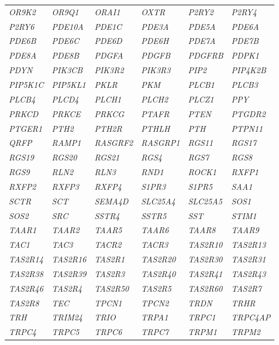 \begin{longtable}{>{\em}l>{\em}l>{\em}l>{\em}l>{\em}l>{\em}l}
  \rowcolor{black!10} 
  OR9K2 & OR9Q1 & ORAI1 & OXTR & P2RY2 & P2RY4 \\ 
  \rowcolor{black!5} 
  P2RY6 & PDE10A & PDE1C & PDE3A & PDE5A & PDE6A \\ 
  \rowcolor{black!10} 
  PDE6B & PDE6C & PDE6D & PDE6H & PDE7A & PDE7B \\ 
  \rowcolor{black!5} 
  PDE8A & PDE8B & PDGFA & PDGFB & PDGFRB & PDPK1 \\ 
  \rowcolor{black!10} 
  PDYN & PIK3CB & PIK3R2 & PIK3R3 & PIP2 & PIP4K2B \\ 
  \rowcolor{black!5} 
  PIP5K1C & PIP5KL1 & PKLR & PKM & PLCB1 & PLCB3 \\ 
  \rowcolor{black!10} 
  PLCB4 & PLCD4 & PLCH1 & PLCH2 & PLCZ1 & PPY \\ 
  \rowcolor{black!5} 
  PRKCD & PRKCE & PRKCG & PTAFR & PTEN & PTGDR2 \\ 
  \rowcolor{black!10} 
  PTGER1 & PTH2 & PTH2R & PTHLH & PTH & PTPN11 \\ 
  \rowcolor{black!5} 
  QRFP & RAMP1 & RASGRF2 & RASGRP1 & RGS11 & RGS17 \\ 
  \rowcolor{black!10} 
  RGS19 & RGS20 & RGS21 & RGS4 & RGS7 & RGS8 \\ 
  \rowcolor{black!5} 
  RGS9 & RLN2 & RLN3 & RND1 & ROCK1 & RXFP1 \\ 
  \rowcolor{black!10} 
  RXFP2 & RXFP3 & RXFP4 & S1PR3 & S1PR5 & SAA1 \\ 
  \rowcolor{black!5} 
  SCTR & SCT & SEMA4D & SLC25A4 & SLC25A5 & SOS1 \\ 
  \rowcolor{black!10} 
  SOS2 & SRC & SSTR4 & SSTR5 & SST & STIM1 \\ 
  \rowcolor{black!5} 
  TAAR1 & TAAR2 & TAAR5 & TAAR6 & TAAR8 & TAAR9 \\ 
  \rowcolor{black!10} 
  TAC1 & TAC3 & TACR2 & TACR3 & TAS2R10 & TAS2R13 \\ 
  \rowcolor{black!5} 
  TAS2R14 & TAS2R16 & TAS2R1 & TAS2R20 & TAS2R30 & TAS2R31 \\ 
  \rowcolor{black!10} 
  TAS2R38 & TAS2R39 & TAS2R3 & TAS2R40 & TAS2R41 & TAS2R43 \\ 
  \rowcolor{black!5} 
  TAS2R46 & TAS2R4 & TAS2R50 & TAS2R5 & TAS2R60 & TAS2R7 \\ 
  \rowcolor{black!10} 
  TAS2R8 & TEC & TPCN1 & TPCN2 & TRDN & TRHR \\ 
  \rowcolor{black!5} 
  TRH & TRIM24 & TRIO & TRPA1 & TRPC1 & TRPC4AP \\ 
  \rowcolor{black!10} 
  TRPC4 & TRPC5 & TRPC6 & TRPC7 & TRPM1 & TRPM2 \\ 

\end{longtable}
